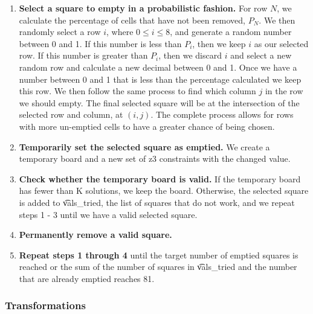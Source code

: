 \begin{enumerate}
\item {\bf Select a square to empty in a probabilistic fashion.} For
  row $N$, we calculate the percentage of cells that have not been
  removed, $P_N$. We then randomly select a row $i$, where $0 \le i
  \le 8$, and generate a random number between 0 and 1. If this number
  is less than $P_i$, then we keep $i$ as our selected row. If this
  number is greater than $P_i$, then we discard $i$ and select a new
  random row and calculate a new decimal between 0 and 1. Once we have
  a number between 0 and 1 that is less than the percentage calculated
  we keep this row. We then follow the same process to find which
  column $j$ in the row we should empty. The final selected square
  will be at the intersection of the selected row and column, at
  $(i,j)$. The complete process allows for rows with more un-emptied
  cells to have a greater chance of being chosen.
\item {\bf Temporarily set the selected square as emptied.} We create a temporary board and a new set of z3 constraints with the changed value.
\item{\bf Check whether the temporary board is valid.} If the temporary board has fewer than K solutions, we keep the board. Otherwise, the selected square is added to \t{vals\_tried}, the list of squares that do not work, and we repeat steps 1 - 3 until we have a valid selected square.
\item{\bf Permanently remove a valid square.}
\item{\bf Repeat steps 1 through 4} until the target number of emptied squares is reached or the sum of the number of squares in \t{vals\_tried} and the number that are already emptied reaches 81. 
\end{enumerate}

\subsubsection{Transformations}


